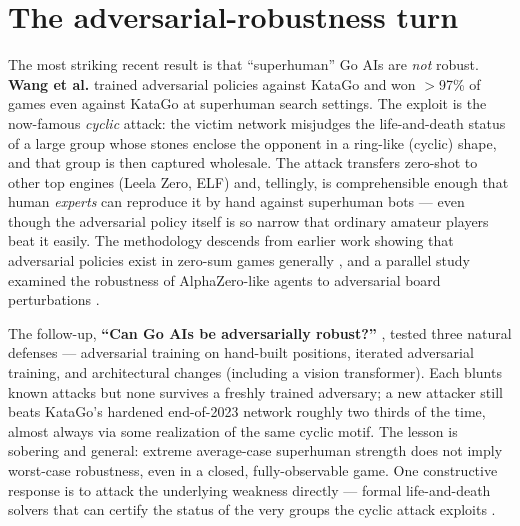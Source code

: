 \documentclass[11pt]{article}
\begin{document}
\section{The adversarial-robustness turn}
\label{sec:robust}
The most striking recent result is that ``superhuman'' Go AIs are \emph{not} robust.
\textbf{Wang et al.} \cite{advgo2023} trained adversarial policies against KataGo and won
$>$97\% of games even against KataGo at superhuman search settings. The exploit is the
now-famous \emph{cyclic} attack: the victim network misjudges the life-and-death status of a
large group whose stones enclose the opponent in a ring-like (cyclic) shape, and that group
is then captured wholesale. The attack transfers zero-shot to other top engines (Leela Zero,
ELF) and, tellingly, is comprehensible enough that human \emph{experts} can reproduce it by
hand against superhuman bots --- even though the adversarial policy itself is so narrow that
ordinary amateur players beat it easily. The methodology descends from earlier work showing that adversarial
policies exist in zero-sum games generally \cite{advpolicies2020}, and a parallel study
examined the robustness of AlphaZero-like agents to adversarial board perturbations
\cite{advperturb2022}.

The follow-up, \textbf{``Can Go AIs be adversarially robust?''} \cite{robustgo2024}, tested
three natural defenses --- adversarial training on hand-built positions, iterated adversarial
training, and architectural changes (including a vision transformer). Each blunts known
attacks but none survives a freshly trained adversary; a new attacker still beats KataGo's
hardened end-of-2023 network roughly two thirds of the time, almost always via some
realization of the same cyclic motif. The lesson is sobering and general: extreme
average-case superhuman strength does not imply worst-case robustness, even in a closed,
fully-observable game. One constructive response is to attack the underlying weakness
directly --- formal life-and-death solvers that can certify the status of the very groups the
cyclic attack exploits \cite{lndsolver2025}.
\end{document}
